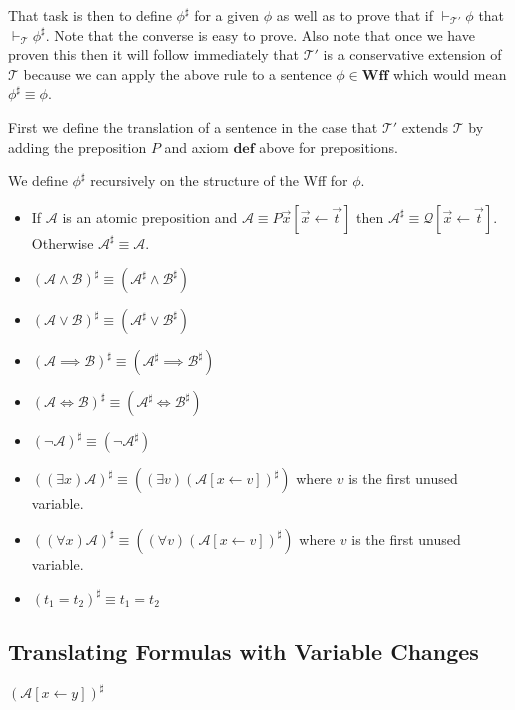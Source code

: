 \documentclass[12pt]{article}
\newcommand{\bv}[1]{\boldsymbol{#1}}
\newcommand{\mc}[1]{\mathcal{#1}}
\newcommand{\bc}[1]{\bv{\mc{#1}}}
\begin{document}
That task is then to define $\phi^{\sharp}$ for a given $\phi$ as well as to prove that if $\vdash_{\bc{T}'}\phi$ that $\vdash_{\bc{T}}\phi^{\sharp}$. Note that the converse is easy to prove. Also note that once we have proven this then it will follow immediately that $\bc{T}'$ is a conservative extension of $\bc{T}$ because we can apply the above rule to a sentence $\phi \in \textbf{Wff}$ which would mean $\phi^{\sharp} \equiv \phi$.

First we define the translation of a sentence in the case that $\bc{T}'$ extends $\bc{T}$ by adding the preposition $P$ and axiom $\textbf{def}$ above for prepositions.

We define $\phi^{\sharp}$ recursively on the structure of the Wff for $\phi$. 

\begin{itemize}
\item{If $\mc{A}$ is an atomic preposition and $\mc{A} \equiv P\vec{x}[\vec{x}\leftarrow \vec{t}]$ then $\mc{A}^{\sharp} \equiv \mc{Q}[\vec{x}\leftarrow \vec{t}]$. Otherwise $\mc{A}^{\sharp} \equiv \mc{A}$.}
\item{$(\mc{A}\land \mc{B})^{\sharp} \equiv (\mc{A}^{\sharp} \land \mc{B}^{\sharp})$}
\item{$(\mc{A} \lor \mc{B})^{\sharp} \equiv (\mc{A}^{\sharp} \lor \mc{B}^{\sharp})$}
\item{$(\mc{A} \implies \mc{B})^{\sharp} \equiv (\mc{A}^{\sharp} \implies \mc{B}^{\sharp})$}
\item{$(\mc{A}\iff \mc{B})^{\sharp} \equiv (\mc{A}^{\sharp} \iff \mc{B}^{\sharp})$}
\item{$(\lnot \mc{A})^{\sharp} \equiv (\lnot \mc{A}^{\sharp})$}
\item{$((\exists x)\mc{A})^{\sharp} \equiv ((\exists v)(\mc{A}[x\leftarrow v])^{\sharp})$ where $v$ is the first unused variable.}
\item{$((\forall x)\mc{A})^{\sharp} \equiv ((\forall v)(\mc{A}[x\leftarrow v])^{\sharp})$ where $v$ is the first unused variable.}
\item{$(t_1=t_2)^{\sharp} \equiv t_1=t_2$}
\end{itemize}

\subsection*{Translating Formulas with Variable Changes}




$(\mc{A}[x\leftarrow y])^{\sharp}$
\end{document}

